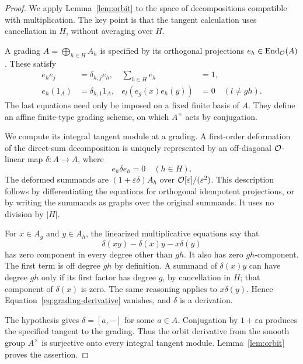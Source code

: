 \begin{proof}
We apply Lemma~\ref{lem:orbit} to the space of decompositions
compatible with multiplication.  The key point is that the tangent
calculation uses cancellation in $H$, without averaging over $H$.

A grading $A=\bigoplus_{h\in H}A_h$ is specified by its
orthogonal projections $e_h\in\operatorname{End}_{\mathcal O}(A)$.  These satisfy
\begin{align*}
 e_he_j&=\delta_{h,j}e_h,& \sum_{h\in H}e_h&=1,\\
 e_h(1_A)&=\delta_{h,1}1_A,&
 e_l(e_g(x)e_h(y))&=0\quad(l\ne gh).
\end{align*}
The last equations need only be imposed on a fixed finite basis
of $A$.  They define an affine finite-type grading scheme, on
which $A^\times$ acts by conjugation.

We compute its integral tangent module at a grading.  A
first-order deformation of the direct-sum decomposition is
uniquely represented by an off-diagonal $\mathcal O$-linear map
$\delta:A\to A$, where
\[
 e_h\delta e_h=0\quad(h\in H).
\]
The deformed summands are $(1+\varepsilon\delta)A_h$ over
$\mathcal O[\varepsilon]/(\varepsilon^2)$.  This description follows
by differentiating the equations for orthogonal idempotent
projections, or by writing the summands as graphs over the
original summands.  It uses no division by $|H|$.

For $x\in A_g$ and $y\in A_h$, the linearized multiplicative
equations say that
\begin{equation}\label{eq:grading-derivative}
 \delta(xy)-\delta(x)y-x\delta(y)
\end{equation}
has zero component in every degree other than $gh$.  It also has
zero $gh$-component.  The first term is off degree $gh$ by
definition.  A summand of $\delta(x)y$ can have degree $gh$ only
if its first factor has degree $g$, by cancellation in $H$; that
component of $\delta(x)$ is zero.  The same reasoning applies
to $x\delta(y)$.  Hence Equation~\eqref{eq:grading-derivative}
vanishes, and $\delta$ is a derivation.

The hypothesis gives $\delta=[a,-]$ for some $a\in A$.
Conjugation by $1+\varepsilon a$ produces the specified tangent
to the grading.  Thus the orbit derivative from the smooth
group $A^\times$ is surjective onto every integral tangent
module.  Lemma~\ref{lem:orbit} proves the assertion.
\end{proof}

